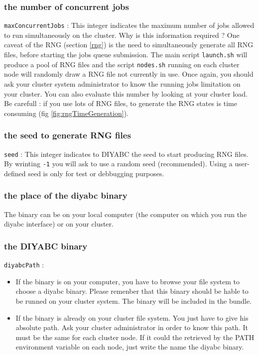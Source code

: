 \subsubsection{the number of concurrent jobs}
\texttt{maxConcurrentJobs} : This integer indicates the maximum number of jobs allowed to run simultaneously on the cluster. Why is this information required ? One caveat of the RNG (section \ref{rng}) is the need to simultaneously generate all RNG files, before starting the jobs queue submission. The main script \texttt{launch.sh} will produce a pool of RNG files and the script \texttt{nodes.sh} running on each cluster node will randomly draw a RNG file not currently in use. Once again, you should ask your cluster system administrator to know the running jobs limitation on your cluster. You can also evaluate this number by looking at your cluster load. Be carefull : if you use lots of RNG files, to generate the RNG states is time consuming (fig \ref{fig:rngTimeGeneration}).

\subsubsection{the seed to generate RNG files}
\texttt{seed} : This integer indicates to DIYABC the seed to start producing RNG files. By wrinting \texttt{-1} you will ask to use a random seed (recommended). Using a user-defined seed is only for test or debbugging purposes. 

\subsubsection{the place of the diyabc binary}
The binary can be on your local computer (the computer on which you run the diyabc interface) or on your cluster. 

\subsubsection{the DIYABC binary}
\texttt{diyabcPath} :  
\begin{itemize}
 \item   If the binary is on your computer, you have to browse your file system to choose a diyabc binary. Please remenber that this binary should be hable to be runned on your cluster system.  The binary will be included in the bundle.  

 \item   If the binary is already on your cluster file system. You just have to give his absolute path. Ask your cluster administrator in order to know this path. It must be the same for each cluster node. If it could the retrieved by the PATH environment variable on each node, just write the name the diyabc binary. 
\end{itemize}

